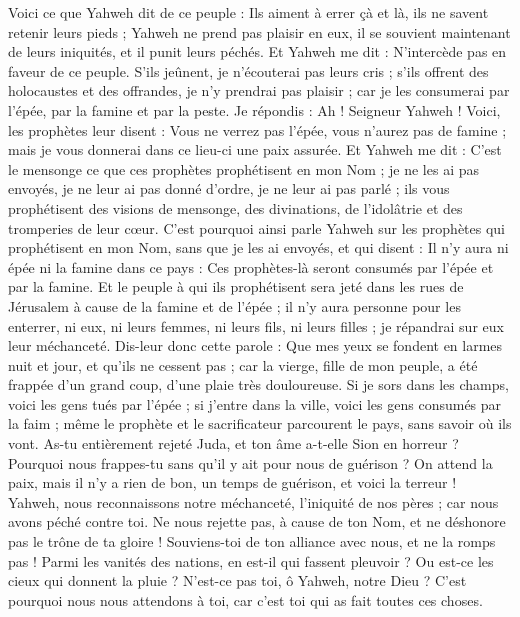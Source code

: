 \begin{multicols}{2}
Voici ce que Yahweh dit de ce peuple : Ils aiment à errer çà et là, ils ne savent retenir leurs pieds ; Yahweh ne prend pas plaisir en eux, il se souvient maintenant de leurs iniquités, et il punit leurs péchés.
Et Yahweh me dit : N'intercède pas en faveur de ce peuple.
S'ils jeûnent, je n'écouterai pas leurs cris ; s'ils offrent des holocaustes et des offrandes, je n'y prendrai pas plaisir ; car je les consumerai par l'épée, par la famine et par la peste.
Je répondis : Ah ! Seigneur Yahweh ! Voici, les prophètes leur disent : Vous ne verrez pas l'épée, vous n'aurez pas de famine ; mais je vous donnerai dans ce lieu-ci une paix assurée.
Et Yahweh me dit : C'est le mensonge ce que ces prophètes prophétisent en mon Nom ; je ne les ai pas envoyés, je ne leur ai pas donné d'ordre, je ne leur ai pas parlé ; ils vous prophétisent des visions de mensonge, des divinations, de l'idolâtrie et des tromperies de leur cœur.
C'est pourquoi ainsi parle Yahweh sur les prophètes qui prophétisent en mon Nom, sans que je les ai envoyés, et qui disent : Il n'y aura ni épée ni la famine dans ce pays : Ces prophètes-là seront consumés par l'épée et par la famine.
Et le peuple à qui ils prophétisent sera jeté dans les rues de Jérusalem à cause de la famine et de l'épée ; il n'y aura personne pour les enterrer, ni eux, ni leurs femmes, ni leurs fils, ni leurs filles ; je répandrai sur eux leur méchanceté.
Dis-leur donc cette parole : Que mes yeux se fondent en larmes nuit et jour, et qu'ils ne cessent pas ; car la vierge, fille de mon peuple, a été frappée d'un grand coup, d'une plaie très douloureuse.
Si je sors dans les champs, voici les gens tués par l'épée ; si j'entre dans la ville, voici les gens consumés par la faim ; même le prophète et le sacrificateur parcourent le pays, sans savoir où ils vont.
As-tu entièrement rejeté Juda, et ton âme a-t-elle Sion en horreur ? Pourquoi nous frappes-tu sans qu'il y ait pour nous de guérison ? On attend la paix, mais il n'y a rien de bon, un temps de guérison, et voici la terreur !
Yahweh, nous reconnaissons notre méchanceté, l'iniquité de nos pères ; car nous avons péché contre toi.
Ne nous rejette pas, à cause de ton Nom, et ne déshonore pas le trône de ta gloire ! Souviens-toi de ton alliance avec nous, et ne la romps pas !
Parmi les vanités des nations, en est-il qui fassent pleuvoir ? Ou est-ce les cieux qui donnent la pluie ? N'est-ce pas toi, ô Yahweh, notre Dieu ? C'est pourquoi nous nous attendons à toi, car c'est toi qui as fait toutes ces choses.

\end{multicols}
